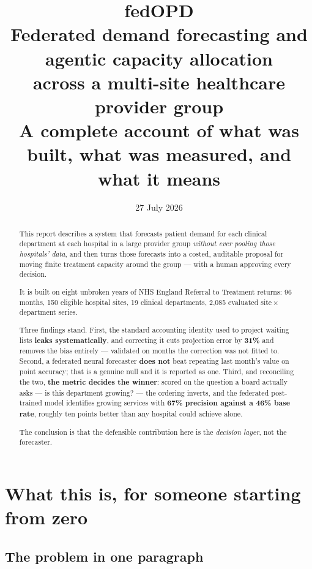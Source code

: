 \documentclass[11pt,a4paper]{article}
\title{\vspace{-1.5cm}\textbf{fedOPD}\\[0.3em]
\large Federated demand forecasting and agentic capacity allocation\\
across a multi-site healthcare provider group\\[0.6em]
\normalsize A complete account of what was built, what was measured, and what it means}
\author{}
\date{27 July 2026}
\begin{document}
\maketitle
\thispagestyle{fancy}

\begin{abstract}
\noindent
This report describes a system that forecasts patient demand for each clinical department at each
hospital in a large provider group \emph{without ever pooling those hospitals' data}, and then turns
those forecasts into a costed, auditable proposal for moving finite treatment capacity around the
group --- with a human approving every decision.

It is built on eight unbroken years of NHS England Referral to Treatment returns: 96 months, 150
eligible hospital sites, 19 clinical departments, 2{,}085 evaluated site\,$\times$\,department series.

Three findings stand. First, the standard accounting identity used to project waiting lists
\textbf{leaks systematically}, and correcting it cuts projection error by \textbf{31\%} and removes the
bias entirely --- validated on months the correction was not fitted to. Second, a federated neural
forecaster \textbf{does not} beat repeating last month's value on point accuracy; that is a genuine
null and it is reported as one. Third, and reconciling the two, \textbf{the metric decides the winner}:
scored on the question a board actually asks --- is this department growing? --- the ordering inverts,
and the federated post-trained model identifies growing services with \textbf{67\% precision against a
46\% base rate}, roughly ten points better than any hospital could achieve alone.

The conclusion is that the defensible contribution here is the \emph{decision layer}, not the
forecaster.
\end{abstract}

\tableofcontents
\newpage

\section{What this is, for someone starting from zero}
\label{sec:intro}

\subsection{The problem in one paragraph}
\end{document}
